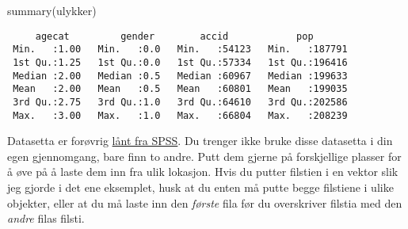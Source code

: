 \documentclass[
  letterpaper,
  DIV=11,
  numbers=noendperiod]{scrartcl}
\newenvironment{Shaded}{\begin{snugshade}}{\end{snugshade}}
\newcommand{\FunctionTok}[1]{\textcolor[rgb]{0.28,0.35,0.67}{#1}}
\newcommand{\NormalTok}[1]{\textcolor[rgb]{0.00,0.23,0.31}{#1}}
\begin{document}
\begin{Shaded}
\begin{Highlighting}[]
\FunctionTok{summary}\NormalTok{(ulykker)}
\end{Highlighting}
\end{Shaded}

\begin{verbatim}
     agecat         gender        accid            pop        
 Min.   :1.00   Min.   :0.0   Min.   :54123   Min.   :187791  
 1st Qu.:1.25   1st Qu.:0.0   1st Qu.:57334   1st Qu.:196416  
 Median :2.00   Median :0.5   Median :60967   Median :199633  
 Mean   :2.00   Mean   :0.5   Mean   :60801   Mean   :199035  
 3rd Qu.:2.75   3rd Qu.:1.0   3rd Qu.:64610   3rd Qu.:202586  
 Max.   :3.00   Max.   :1.0   Max.   :66804   Max.   :208239  
\end{verbatim}

Datasetta er forøvrig
\href{https://www.ibm.com/docs/en/spss-statistics/saas?topic=tutorial-sample-files}{lånt
fra SPSS}. Du trenger ikke bruke disse datasetta i din egen gjennomgang,
bare finn to andre. Putt dem gjerne på forskjellige plasser for å øve på
å laste dem inn fra ulik lokasjon. Hvis du putter filstien i en vektor
slik jeg gjorde i det ene eksemplet, husk at du enten må putte begge
filstiene i ulike objekter, eller at du må laste inn den \emph{første}
fila før du overskriver filstia med den \emph{andre} filas filsti.
\end{document}
